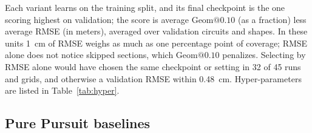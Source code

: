 \documentclass[10pt,twocolumn,twoside]{article}
\makeatletter
\newcommand{\geom}[1]{\mathrm{Geom}@#1}
\makeatother
\begin{document}
Each variant learns on the training split, and its final checkpoint is the one
scoring highest on validation; the score is average $\geom{0.10}$ (as a
fraction) less average RMSE (in meters), averaged over validation circuits and
shapes. In these units 1~cm of
RMSE weighs as much as one percentage point of coverage; RMSE alone does not
notice skipped sections, which $\geom{0.10}$ penalizes. Selecting by RMSE alone
would have chosen the same checkpoint or setting in 32 of 45 runs and grids, and
otherwise a validation RMSE within 0.48~cm. Hyper-parameters are listed in
Table~\ref{tab:hyper}.

\begin{table}[t]
\caption{Learning hyper-parameters.}
\label{tab:hyper}
\centering
{}
\end{table}

\subsection{Pure Pursuit baselines}
\end{document}
